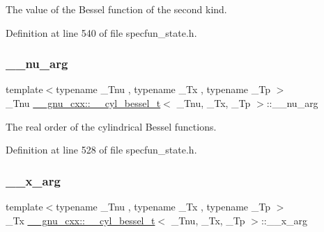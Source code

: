 The value of the Bessel function of the second kind. 



Definition at line 540 of file specfun\+\_\+state.\+h.

\mbox{\label{struct____gnu__cxx_1_1____cyl__bessel__t_a3d17d7f7196d7aef725228cf02269195}} 
\subsubsection{\texorpdfstring{\+\_\+\+\_\+nu\+\_\+arg}{\_\_nu\_arg}}
{\footnotesize\ttfamily template$<$typename \+\_\+\+Tnu , typename \+\_\+\+Tx , typename \+\_\+\+Tp $>$ \\
\+\_\+\+Tnu \hyperlink{struct____gnu__cxx_1_1____cyl__bessel__t}{\+\_\+\+\_\+gnu\+\_\+cxx\+::\+\_\+\+\_\+cyl\+\_\+bessel\+\_\+t}$<$ \+\_\+\+Tnu, \+\_\+\+Tx, \+\_\+\+Tp $>$\+::\+\_\+\+\_\+nu\+\_\+arg}



The real order of the cylindrical Bessel functions. 



Definition at line 528 of file specfun\+\_\+state.\+h.

\mbox{\label{struct____gnu__cxx_1_1____cyl__bessel__t_aac526f7bf86ebf0201e46545d9927f15}} 
\subsubsection{\texorpdfstring{\+\_\+\+\_\+x\+\_\+arg}{\_\_x\_arg}}
{\footnotesize\ttfamily template$<$typename \+\_\+\+Tnu , typename \+\_\+\+Tx , typename \+\_\+\+Tp $>$ \\
\+\_\+\+Tx \hyperlink{struct____gnu__cxx_1_1____cyl__bessel__t}{\+\_\+\+\_\+gnu\+\_\+cxx\+::\+\_\+\+\_\+cyl\+\_\+bessel\+\_\+t}$<$ \+\_\+\+Tnu, \+\_\+\+Tx, \+\_\+\+Tp $>$\+::\+\_\+\+\_\+x\+\_\+arg}



